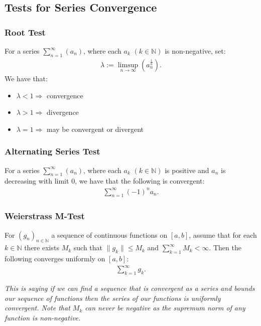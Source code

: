 \documentclass[a4paper, 12pt, twoside]{article}
\begin{document}
\subsection{Tests for Series Convergence}

\subsubsection{Root Test}

For a series $\sum_{n = 1}^\infty(a_n)$, where each $a_k$ $(k\in\mathbb{N})$
is non-negative, set:
\begin{align*}
      \lambda := \limsup_{n\to\infty}(a_n^{\frac{1}{n}}).
\end{align*}
We have that:

\begin{itemize}
      \item $\lambda < 1 \Rightarrow$ convergence
      \item $\lambda > 1 \Rightarrow$ divergence
      \item $\lambda = 1 \Rightarrow$ may be convergent or divergent
\end{itemize}

\subsubsection{Alternating Series Test}

For a series $\sum_{n = 1}^\infty(a_n)$, where each $a_k$ $(k\in\mathbb{N})$
is positive and $a_n$ is decreasing with limit $0$, we have that the following
is convergent:
\begin{align*}
      \sum_{n=1}^\infty(-1)^na_n.
\end{align*}

\subsubsection{Weierstrass M-Test}

For $(g_n)_{n\in\mathbb{N}}$ a sequence of continuous functions on $[a, b]$,
assume that for each $k\in\mathbb{N}$ there exists $M_k$ such that
$\|g_k\| \leq M_k$ and $\sum_{k = 1}^\infty M_k < \infty$. Then the following
converges uniformly on $[a, b]$:
\begin{align*}
      \sum_{k = 1}^\infty g_k.
\end{align*}

\textit{This is saying if we can find a sequence that is convergent as a series
      and bounds our sequence of functions then the series of our functions is
      uniformly convergent. Note that $M_k$ can never be negative as the
      supremum norm of any function is non-negative.}
\end{document}
